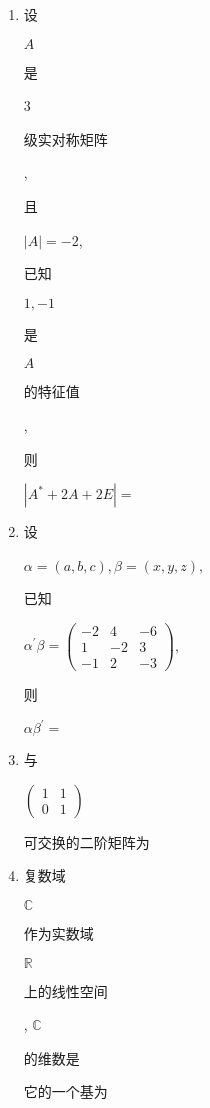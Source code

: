 \documentclass[10pt]{article}
\begin{document}
\begin{enumerate}
  \item \begin{CJK}{UTF8}{mj}设\end{CJK} $A$ \begin{CJK}{UTF8}{mj}是\end{CJK} 3 \begin{CJK}{UTF8}{mj}级实对称矩阵\end{CJK}, \begin{CJK}{UTF8}{mj}且\end{CJK} $|A|=-2$, \begin{CJK}{UTF8}{mj}已知\end{CJK} $1,-1$ \begin{CJK}{UTF8}{mj}是\end{CJK} $A$ \begin{CJK}{UTF8}{mj}的特征值\end{CJK}, \begin{CJK}{UTF8}{mj}则\end{CJK} $\left|A^{*}+2 A+2 E\right|=$

  \item \begin{CJK}{UTF8}{mj}设\end{CJK} $\alpha=(a, b, c), \beta=(x, y, z)$, \begin{CJK}{UTF8}{mj}已知\end{CJK} $\alpha^{\prime} \beta=\left(\begin{array}{ccc}-2 & 4 & -6 \\ 1 & -2 & 3 \\ -1 & 2 & -3\end{array}\right)$, \begin{CJK}{UTF8}{mj}则\end{CJK} $\alpha \beta^{\prime}=$

  \item \begin{CJK}{UTF8}{mj}与\end{CJK} $\left(\begin{array}{ll}1 & 1 \\ 0 & 1\end{array}\right)$ \begin{CJK}{UTF8}{mj}可交换的二阶矩阵为\end{CJK}

  \item \begin{CJK}{UTF8}{mj}复数域\end{CJK} $\mathbb{C}$ \begin{CJK}{UTF8}{mj}作为实数域\end{CJK} $\mathbb{R}$ \begin{CJK}{UTF8}{mj}上的线性空间\end{CJK}, $\mathbb{C}$ \begin{CJK}{UTF8}{mj}的维数是\end{CJK} \begin{CJK}{UTF8}{mj}它的一个基为\end{CJK}

\end{enumerate}
\end{document}
